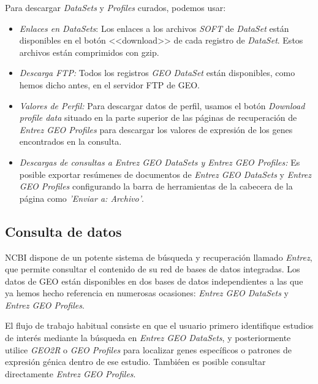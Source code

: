 Para descargar \textit{DataSets} y \textit{Profiles} curados, podemos usar:

\begin{itemize}
    \item \textit{Enlaces en DataSets}: Los enlaces a los archivos \textit{SOFT} de \textit{DataSet} están disponibles en el botón <<download>> de cada registro de \textit{DataSet}. Estos archivos están comprimidos
    con gzip.
    \item \textit{Descarga FTP:} Todos los registros \textit{GEO DataSet} están disponibles, como hemos dicho antes, en el servidor FTP de GEO.
    \item \textit{Valores de Perfil:} Para descargar datos de perfil, usamos el botón \textit{Download profile data} situado en la parte superior de las páginas de recuperación de 
    \textit{Entrez GEO Profiles} para descargar los valores de expresión de los genes encontrados en la consulta.
    \item \textit{Descargas de consultas a Entrez GEO DataSets y Entrez GEO Profiles:} Es posible exportar resúmenes de documentos de \textit{Entrez GEO DataSets} y \textit{Entrez GEO Profiles} configurando la barra
    de herramientas de la cabecera de la página como \textit{'Enviar a: Archivo'}.
\end{itemize}

\subsection{Consulta de datos}


NCBI dispone de un potente sistema de búsqueda y recuperación llamado \textit{Entrez}, que permite consultar el contenido de su red de bases de datos integradas. Los datos de GEO están disponibles en dos bases de
datos independientes a las que ya hemos hecho referencia en numerosas ocasiones: \textit{Entrez GEO DataSets} y \textit{Entrez GEO Profiles}. \newline

El flujo de trabajo habitual consiste en que el usuario primero identifique estudios de interés mediante la búsqueda en \textit{Entrez GEO DataSets}, y posteriormente utilice \textit{GEO2R} o \textit{GEO Profiles} para
localizar genes específicos o patrones de expresión génica dentro de ese estudio. Tambiéen es posible consultar directamente \textit{Entrez GEO Profiles}. \newline

